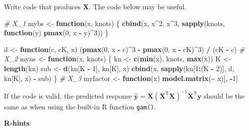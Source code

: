 \documentclass[
]{article}
\newenvironment{Shaded}{\begin{snugshade}}{\end{snugshade}}
\newcommand{\CommentTok}[1]{\textcolor[rgb]{0.56,0.35,0.01}{\textit{#1}}}
\newcommand{\ControlFlowTok}[1]{\textcolor[rgb]{0.13,0.29,0.53}{\textbf{#1}}}
\newcommand{\DecValTok}[1]{\textcolor[rgb]{0.00,0.00,0.81}{#1}}
\newcommand{\FunctionTok}[1]{\textcolor[rgb]{0.13,0.29,0.53}{\textbf{#1}}}
\newcommand{\NormalTok}[1]{#1}
\newcommand{\OtherTok}[1]{\textcolor[rgb]{0.56,0.35,0.01}{#1}}
\newcommand{\SpecialCharTok}[1]{\textcolor[rgb]{0.81,0.36,0.00}{\textbf{#1}}}
\begin{document}
Write code that produces \(\mathbf X\). The code below may be useful.

\begin{Shaded}
\begin{Highlighting}[]
\CommentTok{\# X\_1}
\NormalTok{mybs }\OtherTok{\textless{}{-}} \ControlFlowTok{function}\NormalTok{(x, knots) \{}
  \FunctionTok{cbind}\NormalTok{(x, x}\SpecialCharTok{\^{}}\DecValTok{2}\NormalTok{, x}\SpecialCharTok{\^{}}\DecValTok{3}\NormalTok{, }\FunctionTok{sapply}\NormalTok{(knots, }\ControlFlowTok{function}\NormalTok{(y) }\FunctionTok{pmax}\NormalTok{(}\DecValTok{0}\NormalTok{, x }\SpecialCharTok{{-}}\NormalTok{ y)}\SpecialCharTok{\^{}}\DecValTok{3}\NormalTok{))}
\NormalTok{\}}

\NormalTok{d }\OtherTok{\textless{}{-}} \ControlFlowTok{function}\NormalTok{(c, cK, x) (}\FunctionTok{pmax}\NormalTok{(}\DecValTok{0}\NormalTok{, x }\SpecialCharTok{{-}}\NormalTok{ c)}\SpecialCharTok{\^{}}\DecValTok{3} \SpecialCharTok{{-}} \FunctionTok{pmax}\NormalTok{(}\DecValTok{0}\NormalTok{, x }\SpecialCharTok{{-}}\NormalTok{ cK)}\SpecialCharTok{\^{}}\DecValTok{3}\NormalTok{) }\SpecialCharTok{/}\NormalTok{ (cK }\SpecialCharTok{{-}}\NormalTok{ c)}
\CommentTok{\# X\_2}
\NormalTok{myns }\OtherTok{\textless{}{-}} \ControlFlowTok{function}\NormalTok{(x, knots) \{}
\NormalTok{  kn }\OtherTok{\textless{}{-}} \FunctionTok{c}\NormalTok{(}\FunctionTok{min}\NormalTok{(x), knots, }\FunctionTok{max}\NormalTok{(x))}
\NormalTok{  K }\OtherTok{\textless{}{-}} \FunctionTok{length}\NormalTok{(kn)}
\NormalTok{  sub }\OtherTok{\textless{}{-}} \FunctionTok{d}\NormalTok{(kn[K }\SpecialCharTok{{-}} \DecValTok{1}\NormalTok{], kn[K], x)}
  \FunctionTok{cbind}\NormalTok{(x, }\FunctionTok{sapply}\NormalTok{(kn[}\DecValTok{1}\SpecialCharTok{:}\NormalTok{(K }\SpecialCharTok{{-}} \DecValTok{2}\NormalTok{)], d, kn[K], x) }\SpecialCharTok{{-}}\NormalTok{ sub)}
\NormalTok{\}}
\CommentTok{\# X\_3}
\NormalTok{myfactor }\OtherTok{\textless{}{-}} \ControlFlowTok{function}\NormalTok{(x) }\FunctionTok{model.matrix}\NormalTok{(}\SpecialCharTok{\textasciitilde{}}\NormalTok{ x)[, }\SpecialCharTok{{-}}\DecValTok{1}\NormalTok{]}
\end{Highlighting}
\end{Shaded}

If the code is valid, the predicted response
\(\hat{\mathbf y} = \mathbf X(\mathbf X^\mathsf{T} \mathbf X)^{-1} \mathbf X^\mathsf{T} \mathbf y\)
should be the same as when using the built-in R function \texttt{gam()}.

\textbf{R-hints}:
\end{document}
